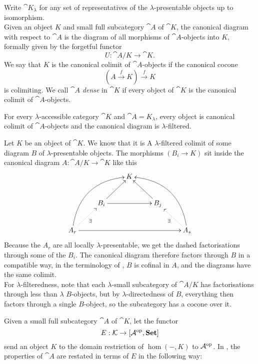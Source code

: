 Write $\cat K_\lambda$ for any set of representatives of the $\lambda$-presentable objects up to isomorphism. \\

Given an object $K$ and small full subcategory $\cat A$ of $\cat K$, the canonical diagram with respect to $\cat A$ is the diagram of all morphisms of $\cat A$-objects into $K$, formally given by the forgetful functor
\[ U : \cat A/K \to \cat K. \]
We say that $K$ is the canonical colimit of $\cat A$-objects if the canonical cocone
\[ (A \xrightarrow{f} K) \xrightarrow{f} K \]
is colimiting. We call $\cat A$ \emph{dense} in $\cat K$ if every object of $\cat K$ is the canonical colimit of $\cat A$-objects.

\begin{Proposition}\label{prop:presdense}
For every $\lambda$-accessible category $\cat K$ and $\cat A = K_\lambda$, every object is canonical colimit of $\cat A$-objects and the canonical diagram is $\lambda$-filtered.
\end{Proposition}
\begin{Proof}
Let $K$ be an object of $\cat K$. We know that it is A $\lambda$-filtered colimit of some diagram $B$ of $\lambda$-presentable objects. The morphisms $(B_i \to K)$ sit inside the canonical diagram $A : \cat A/K \to \cat K$ like this
\[
\xymatrix{
  & & K & & \\
& B_i \ar[rr] \ar[ru] & & B_j \ar[lu] & \\
A_r \ar[rrrr] \ar@/^2pc/[rruu] \ar@{.>}[ru]_{\exists} & & & & A_s \ar@{.>}[lu]^{\exists} \ar@/_2pc/[lluu]
}\]
Because the $A_r$ are all locally $\lambda$-presentable, we get the dashed factorisations through some of the $B_i$. The canonical diagram therefore factors through $B$ in a compatible way, in the terminology of \cite[\nopp~0.11]{AdamekRosicky}, $B$ is cofinal in $A$, and the diagrams have the same colimit. \\

For $\lambda$-filteredness, note that each $\lambda$-small subcategory of $\cat A/K$ has factorisations through less than $\lambda$ $B$-objects, but by $\lambda$-directedness of $B$, everything then factors through a single $B$-object, so the subcategory has a cocone over it. 
\end{Proof}

Given a small full subcategory $\cat A$ of $\cat K$, let the functor 
\[ E : \mathcal{K} \to [\mathcal{A}^{\textrm{op}},\mathbf{Set}] \]
send an object $K$ to the domain restriction of $\hom(-, K)$ to $\mathcal{A}^{\textrm{op}}$. In \cite[\nopp~2.8]{AdamekRosicky}, the properties of $\cat A$ are restated in terms of $E$ in the following way:

